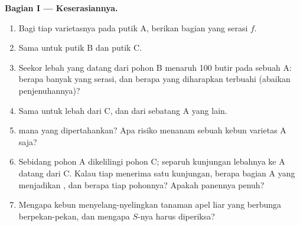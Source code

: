 \begin{problem}
\medskip
\noindent\textbf{Bagian I --- Keserasiannya.}
\begin{enumerate}
  \item Bagi  tiap varietasnya pada putik A, berikan bagian
        yang serasi $f$.
  \item Sama untuk putik B dan putik C.
  \item Seekor lebah yang datang dari pohon B menaruh 100 butir pada
        sebuah  A: berapa banyak yang serasi, dan berapa
         yang diharapkan terbuahi (abaikan penjenuhannya)?
  \item Sama untuk lebah dari C, dan dari sebatang A yang lain.
  \item {} mana yang dipertahankan? Apa risiko menanam sebuah kebun
        varietas A saja?
  \item Sebidang pohon A dikelilingi pohon C; separuh kunjungan
        lebahnya ke A datang dari C. Kalau tiap  menerima satu
        kunjungan, berapa bagian  A yang menjadikan , dan
        berapa  tiap pohonnya? Apakah panennya penuh?
  \item Mengapa kebun menyelang-nyelingkan tanaman apel liar yang
        berbunga berpekan-pekan, dan mengapa  $S$-nya harus
        diperiksa?
\end{enumerate}


\end{problem}
